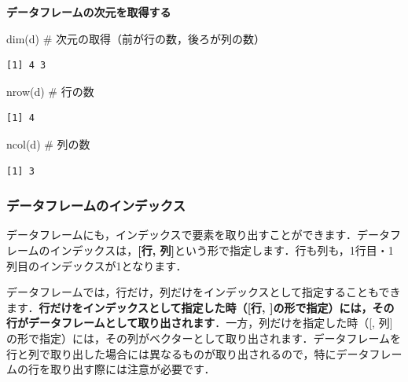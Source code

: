\documentclass[
  letterpaper,
  DIV=11,
  numbers=noendperiod]{scrreprt}
\newenvironment{Shaded}{\begin{snugshade}}{\end{snugshade}}
\newcommand{\CommentTok}[1]{\textcolor[rgb]{0.37,0.37,0.37}{#1}}
\newcommand{\FunctionTok}[1]{\textcolor[rgb]{0.28,0.35,0.67}{#1}}
\newcommand{\NormalTok}[1]{\textcolor[rgb]{0.00,0.23,0.31}{#1}}
\begin{document}
\textbf{データフレームの次元を取得する}

\begin{Shaded}
\begin{Highlighting}[]
\FunctionTok{dim}\NormalTok{(d) }\CommentTok{\# 次元の取得（前が行の数，後ろが列の数）}
\end{Highlighting}
\end{Shaded}

\begin{verbatim}
[1] 4 3
\end{verbatim}

\begin{Shaded}
\begin{Highlighting}[]
\FunctionTok{nrow}\NormalTok{(d) }\CommentTok{\# 行の数}
\end{Highlighting}
\end{Shaded}

\begin{verbatim}
[1] 4
\end{verbatim}

\begin{Shaded}
\begin{Highlighting}[]
\FunctionTok{ncol}\NormalTok{(d) }\CommentTok{\# 列の数}
\end{Highlighting}
\end{Shaded}

\begin{verbatim}
[1] 3
\end{verbatim}

\hypertarget{ux30c7ux30fcux30bfux30d5ux30ecux30fcux30e0ux306eux30a4ux30f3ux30c7ux30c3ux30afux30b9}{%
\subsubsection{データフレームのインデックス}\label{ux30c7ux30fcux30bfux30d5ux30ecux30fcux30e0ux306eux30a4ux30f3ux30c7ux30c3ux30afux30b9}}

データフレームにも，インデックスで要素を取り出すことができます．データフレームのインデックスは，\textbf{{[}行,
列{]}}という形で指定します．行も列も，1行目・1列目のインデックスが1となります．

データフレームでは，行だけ，列だけをインデックスとして指定することもできます．\textbf{行だけをインデックスとして指定した時（{[}行,
{]}の形で指定）には，その行がデータフレームとして取り出されます}．一方，列だけを指定した時（{[},
列{]}の形で指定）には，その列がベクターとして取り出されます．データフレームを行と列で取り出した場合には異なるものが取り出されるので，特にデータフレームの行を取り出す際には注意が必要です．
\end{document}
